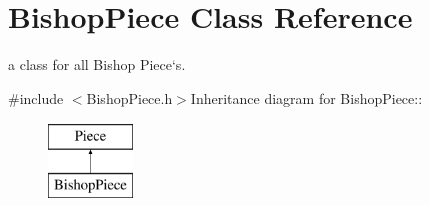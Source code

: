\hypertarget{classBishopPiece}{
\section{BishopPiece Class Reference}
\label{classBishopPiece}
}


a class for all Bishop Piece`s.  


{\ttfamily \#include $<$BishopPiece.h$>$}Inheritance diagram for BishopPiece::\begin{figure}[H]
\begin{center}
\leavevmode
\includegraphics[height=2cm]{classBishopPiece}
\end{center}
\end{figure}
